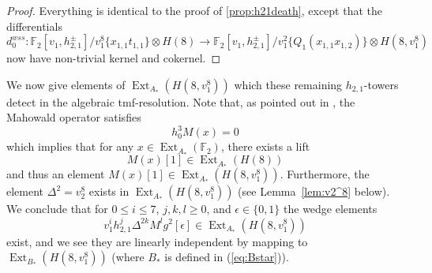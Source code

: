 \documentclass[10pt]{amsart}
\newcommand{\FF}{\mathbb{F}}
\theoremstyle{definition}
\numberwithin{equation}{section}
\numberwithin{figure}{section}
\DeclareMathOperator{\Ext}{Ext}
\begin{document}
\begin{proof}
Everything is identical to the proof of \ref{prop:h21death}, except that the differentials
$$ d_0^{wss}: \FF_2[v_1, h^{\pm}_{2,1}]/v_1^8 \{x_{1,1}t_{1,1}\} \otimes H(8) \rightarrow \FF_2[v_1, h_{2,1}^{\pm}]/v_1^2 \{ Q_1(x_{1,1}x_{1,2}) \}\otimes H(8,v_1^8) $$
now have non-trivial kernel and cokernel.
\end{proof}

We now give elements of $\Ext_{A_*}(H(8,v_1^8))$ which these remaining $h_{2,1}$-towers detect in the algebraic tmf-resolution.
Note that, as pointed out in \cite{MargolisPriddyTangora}, the Mahowald operator satisfies 
$$ h_0^3 M(x) = 0 $$
which implies that for any $x \in \Ext_{A_*}(\FF_2)$, there exists a lift 
$$ M(x)[1] \in \Ext_{A_*}(H(8)) $$
and thus an element $M(x)[1] \in \Ext_{A_*}(H(8,v_1^8))$.  Furthermore, the element $\Delta^2 = v_2^8$ exists in $\Ext_{A_*}(H(8,v_1^8))$ (see Lemma~\ref{lem:v2^8} below).  
We conclude that for $0 \le i \le 7$, $j,k,l \ge 0$, and $\epsilon \in \{0,1\}$
the wedge elements
$$ v_1^i h^j_{2,1}\Delta^{2k}M^l g^2 [\epsilon] \in \Ext_{A_*}(H(8,v_1^8)) $$
exist, and we see they are linearly independent by mapping to $\Ext_{B_*}(H(8,v_1^8))$ (where $B_*$ is defined in (\ref{eq:Bstar})).
\end{document}
